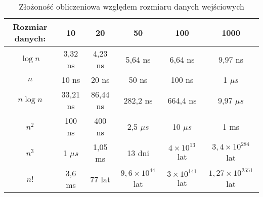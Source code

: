 \begin{table}[htbp]
	\centering
        \renewcommand{\arraystretch}{1.5}
	\begin{tabular}{| c || c | c | c | c | c |}
		\hline
		Rozmiar danych: & 10 & 20 & 50 & 100 & 1000 \\ \hline \hline
		$\log n$ & 
            3,32 ns & 
            4,23 ns & 
            5,64 ns & 
            6,64 ns &
            9,97 ns \\ \hline
		$n$ & 
            10 ns & 
            20 ns & 
            50 ns & 
            100 ns & 
            1 $\mu s$ \\ \hline
		$n \log n$ &
		33,21 ns &
		86,44 ns &
		282,2 ns &
		664,4 ns &
		9,97 $\mu s$ \\ \hline
		$n^2$ &
		100 ns &
		400 ns &
		2,5 $\mu s$ &
		10 $\mu s$ &
		1 ms \\ \hline
		$n^3$ &
		1 $\mu s$ &
		1,05 ms &
		13 dni &
		  $4 \times 10^{13}$ lat &
		$3,4 \times 10^{284}$ lat \\ \hline
		$n!$ &
		3,6 ms &
		77 lat &
		$9,6 \times 10^{44}$ lat &
		$3 \times 10^{141}$ lat & $1,27 \times 10^{2551}$ lat \\ \hline
	\end{tabular}
    \label{tab:algorytmy_tabela}
    \caption{Złożoność obliczeniowa względem rozmiaru danych wejściowych}
\end{table}